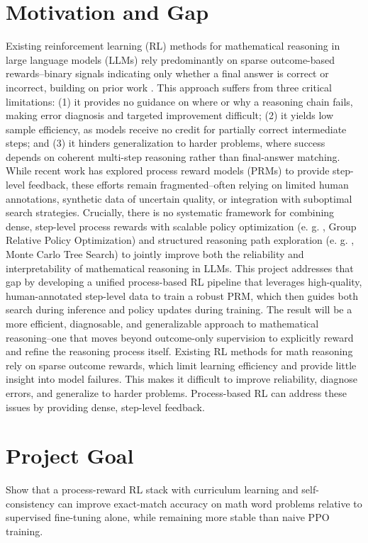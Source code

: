 \documentclass[11pt]{article}
\begin{document}
\section{Motivation and Gap}
Existing reinforcement learning (RL) methods for mathematical reasoning in large language models (LLMs) rely predominantly on sparse outcome-based rewards--binary signals indicating only whether a final answer is correct or incorrect, building on prior work \citep{lightman2023, wang2023, openai2023}.  This approach suffers from three critical limitations: (1) it provides no guidance on where or why a reasoning chain fails, making error diagnosis and targeted improvement difficult; (2) it yields low sample efficiency, as models receive no credit for partially correct intermediate steps; and (3) it hinders generalization to harder problems, where success depends on coherent multi-step reasoning rather than final-answer matching.  While recent work has explored process reward models (PRMs) to provide step-level feedback, these efforts remain fragmented--often relying on limited human annotations, synthetic data of uncertain quality, or integration with suboptimal search strategies.  Crucially, there is no systematic framework for combining dense, step-level process rewards with scalable policy optimization (e. g. , Group Relative Policy Optimization) and structured reasoning path exploration (e. g. , Monte Carlo Tree Search) to jointly improve both the reliability and interpretability of mathematical reasoning in LLMs.  This project addresses that gap by developing a unified process-based RL pipeline that leverages high-quality, human-annotated step-level data to train a robust PRM, which then guides both search during inference and policy updates during training.  The result will be a more efficient, diagnosable, and generalizable approach to mathematical reasoning--one that moves beyond outcome-only supervision to explicitly reward and refine the reasoning process itself.  Existing RL methods for math reasoning rely on sparse outcome rewards, which limit learning efficiency and provide little insight into model failures.  This makes it difficult to improve reliability, diagnose errors, and generalize to harder problems.  Process-based RL can address these issues by providing dense, step-level feedback.

\section{Project Goal}
Show that a process-reward RL stack with curriculum learning and self-consistency can improve exact-match accuracy on math word problems relative to supervised fine-tuning alone, while remaining more stable than naive PPO training.
\end{document}
